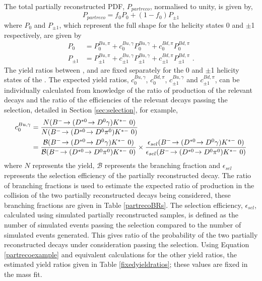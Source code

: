 The total partially reconstructed PDF, $P_{partreco}$, normalised to unity, is given by,
\begin{equation}
P_{partreco} = f_0P_0 + (1 - f_0)P_{\pm 1}
\label{partrecofunction}
\end{equation}
where $P_0$ and $P_{\pm 1}$, which represent the full shape for the \Dstar helicity states 0 and $\pm$1 respectively, are given by
\begin{align*}
P_0 &= P^{Bu,\pi}_0 + c^{Bu,\gamma}_0P^{Bu,\gamma}_0 + c^{Bd,\pi}_0P^{Bd,\pi}_0 \\
P_{\pm 1} &= P^{Bu,\pi}_{\pm 1} + c^{Bu,\gamma}_{\pm 1}P^{Bu,\gamma}_{\pm 1} + c^{Bd,\pi}_{\pm 1}P^{Bd,\pi}_{\pm 1} \text{ .}
\end{align*}
The yield ratios between \decay{\Bm}{(\decay{\Dstarz}{\Dz[\piz]})\Kstarm}, \decay{\Bm}{(\decay{\Dstarz}{\Dz[\gamma]})\Kstarm} and \decay{\Bd}{(\decay{\Dstarp}{\Dz[\pip]})\Kstarm} are fixed separately for the 0 and $\pm$1 helicity states of the \Dstar. The expected yield ratios, $c^{Bu,\gamma}_0$, $c^{Bd,\pi}_0$, $c^{Bu,\gamma}_{\pm 1}$ and $c^{Bd,\pi}_{\pm 1}$, can be individually calculated from knowledge of the ratio of production of the relevant decays and the ratio of the efficiencies of the relevant decays passing the selection, detailed in Section \ref{sec:selection}, for example, 
\begin{align}
c^{Bu,\gamma}_0 &= \frac{N(\decay{\Bm}{(\decay{\Dstarz}{\Dz\gamma})\Kstarm}\ 0)}{N(\decay{\Bm}{(\decay{\Dstarz}{\Dz\piz})\Kstarm}\ 0)} \nonumber \\ 
&= \frac{\mathcal{B}(\decay{\Bm}{(\decay{\Dstarz}{\Dz\gamma})\Kstarm}\ 0)}{\mathcal{B}(\decay{\Bm}{(\decay{\Dstarz}{\Dz\piz})\Kstarm}\ 0)} \times \frac{\epsilon_{sel}(\decay{\Bm}{(\decay{\Dstarz}{\Dz\gamma})\Kstarm}\ 0)}{\epsilon_{sel}(\decay{\Bm}{(\decay{\Dstarz}{\Dz\piz})\Kstarm}\ 0)}
\label{partrecoexample}
\end{align}
where $N$ represents the yield, $\mathcal{B}$ represents the branching fraction and $\epsilon_{sel}$ represents the selection efficiency of the partially reconstructed decay. The ratio of branching fractions is used to estimate the expected ratio of production in the collision of the two partially reconstructed decays being considered, these branching fractions are given in Table \ref{partrecoBRs}. The selection efficiency, $\epsilon_{sel}$, calculated using simulated partially reconstructed samples, is defined as the number of simulated events passing the selection compared to the number of simulated events generated. This gives ratio of the probability of the two partially reconstructed decays under consideration passing the selection. Using Equation \ref{partrecoexample} and equivalent calculations for the other yield ratios, the estimated yield ratios given in Table \ref{fixedyieldratios}; these values are fixed in the mass fit. 

